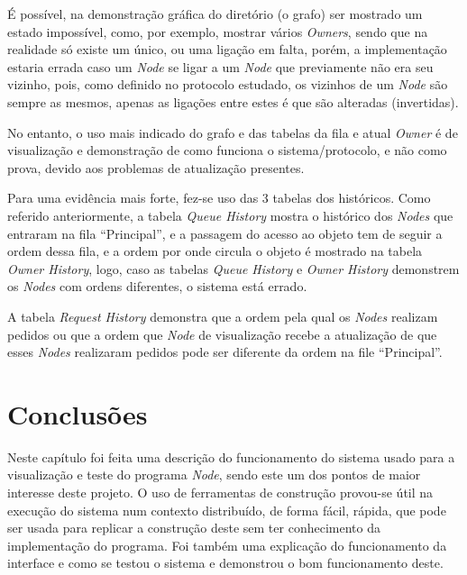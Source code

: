 É possível, na demonstração gráfica do diretório (o grafo) ser mostrado um estado impossível, como, por exemplo, mostrar vários \emph{Owners}, sendo que na realidade só existe um único, ou uma ligação em falta, porém, a implementação estaria errada caso um \emph{Node} se ligar a um \emph{Node} que previamente não era seu vizinho, pois, como definido no protocolo estudado, os vizinhos de um \emph{Node} são sempre as mesmos, apenas as ligações entre estes é que são alteradas (invertidas).

No entanto, o uso mais indicado do grafo e das tabelas da fila e atual \emph{Owner} é de visualização e demonstração de como funciona o sistema/protocolo, e não como prova, devido aos problemas de atualização presentes. 

Para uma evidência mais forte, fez-se uso das 3 tabelas dos históricos. 
Como referido anteriormente, a tabela \emph{Queue History} mostra o histórico dos \emph{Nodes} que entraram na fila ``Principal'', e a passagem do acesso ao objeto tem de seguir a ordem dessa fila, e a ordem por onde circula o objeto é mostrado na tabela \emph{Owner History}, logo, caso as tabelas \emph{Queue History} e \emph{Owner History} demonstrem os \emph{Nodes} com ordens diferentes, o sistema está errado.

A tabela \emph{Request History} demonstra que a ordem pela qual os \emph{Nodes} realizam pedidos ou que a ordem que \emph{Node} de visualização recebe a atualização de que esses \emph{Nodes} realizaram pedidos pode ser diferente da ordem na file ``Principal''.



\section{Conclusões}
\label{validacao:sec:conclusoes}
Neste capítulo foi feita uma descrição do funcionamento do sistema usado para a visualização e teste do programa \emph{Node}, sendo este um dos pontos de maior interesse deste projeto. O uso de ferramentas de construção provou-se útil na execução do sistema num contexto distribuído, de forma fácil, rápida, que pode ser usada para replicar a construção deste sem ter conhecimento da implementação do programa. Foi também uma explicação do funcionamento da interface e como se testou o sistema e demonstrou o bom funcionamento deste.

